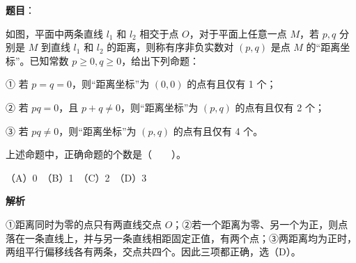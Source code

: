 \begin{answer}

\textbf{题目}：

如图，平面中两条直线 $l_1$ 和 $l_2$ 相交于点 $O$，对于平面上任意一点 $M$，若 $p,q$ 分别是 $M$ 到直线 $l_1$ 和 $l_2$ 的距离，则称有序非负实数对 $(p,q)$ 是点 $M$ 的“距离坐标”。已知常数 $p\ge0,q\ge0$，给出下列命题：

① 若 $p=q=0$，则“距离坐标”为 $(0,0)$ 的点有且仅有 1 个；

② 若 $pq=0$，且 $p+q\ne0$，则“距离坐标”为 $(p,q)$ 的点有且仅有 2 个；

③ 若 $pq\ne0$，则“距离坐标”为 $(p,q)$ 的点有且仅有 4 个。

上述命题中，正确命题的个数是\mbox{（　　）}。

（A）0　（B）1　（C）2　（D）3
\nopagebreak[4]
\begin{center}\end{center}
\nopagebreak[4]
\textbf{解析}

①距离同时为零的点只有两直线交点 $O$；②若一个距离为零、另一个为正，则点落在一条直线上，并与另一条直线相距固定正值，有两个点；③两距离均为正时，两组平行偏移线各有两条，交点共四个。因此三项都正确，选（D）。


\end{answer}

